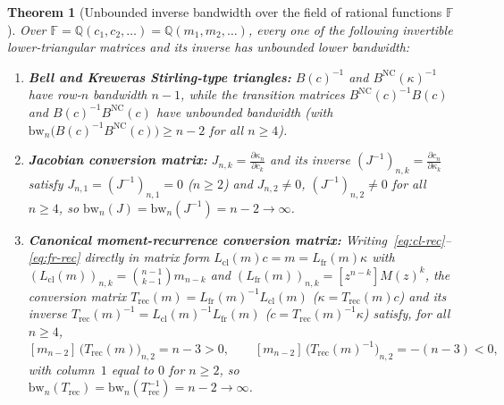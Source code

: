 \documentclass[11pt,a4paper]{article}
\newtheorem{theorem}{Theorem}[section]
\theoremstyle{definition}
\theoremstyle{remark}
\newcommand{\NC}{\mathrm{NC}}
\newcommand{\cl}{\mathrm{cl}}
\newcommand{\fr}{\mathrm{fr}}
\newcommand{\Q}{\mathbb{Q}}
\begin{document}
\begin{theorem}[Unbounded inverse bandwidth over the field of rational functions $\mathbb{F}$]\label{thm:rat-matrices-bw}
Over $\mathbb{F} = \Q(c_1,c_2,\dots) = \Q(m_1,m_2,\dots)$, every one of the following invertible lower-triangular matrices and its inverse has unbounded lower bandwidth:
\begin{enumerate}
  \item[(a)] \textbf{Bell and Kreweras Stirling-type triangles:} $B(c)^{-1}$ and $B^{\NC}(\kappa)^{-1}$ have row-$n$ bandwidth $n - 1$, while the transition matrices $B^{\NC}(c)^{-1}B(c)$ and $B(c)^{-1}B^{\NC}(c)$ have unbounded bandwidth (with $\mathrm{bw}_n\bigl(B(c)^{-1}B^{\NC}(c)\bigr) \ge n - 2$ for all $n \ge 4$).
  \item[(b)] \textbf{Jacobian conversion matrix:} $J_{n,k} = \frac{\partial \kappa_n}{\partial c_k}$ and its inverse $(J^{-1})_{n,k} = \frac{\partial c_n}{\partial \kappa_k}$ satisfy $J_{n,1} = (J^{-1})_{n,1} = 0$ ($n \ge 2$) and $J_{n,2} \ne 0$, $(J^{-1})_{n,2} \ne 0$ for all $n \ge 4$, so $\mathrm{bw}_n(J) = \mathrm{bw}_n(J^{-1}) = n - 2 \to \infty$.
  \item[(c)] \textbf{Canonical moment-recurrence conversion matrix:} Writing~\eqref{eq:cl-rec}--\eqref{eq:fr-rec} directly in matrix form $L_{\cl}(m) c = m = L_{\fr}(m)\kappa$ with $(L_{\cl}(m))_{n,k} = \binom{n-1}{k-1} m_{n-k}$ and $(L_{\fr}(m))_{n,k} = [z^{n-k}]M(z)^k$, the conversion matrix $T_{\mathrm{rec}}(m) = L_{\fr}(m)^{-1}L_{\cl}(m)$ ($\kappa = T_{\mathrm{rec}}(m) c$) and its inverse $T_{\mathrm{rec}}(m)^{-1} = L_{\cl}(m)^{-1}L_{\fr}(m)$ ($c = T_{\mathrm{rec}}(m)^{-1}\kappa$) satisfy, for all $n \ge 4$,
  \begin{equation}\label{eq:trec-col2}
    [m_{n-2}]\,\bigl(T_{\mathrm{rec}}(m)\bigr)_{n,2} = n - 3 > 0, \qquad
    [m_{n-2}]\,\bigl(T_{\mathrm{rec}}(m)^{-1}\bigr)_{n,2} = -(n - 3) < 0,
  \end{equation}
  with column~$1$ equal to $0$ for $n \ge 2$, so $\mathrm{bw}_n(T_{\mathrm{rec}}) = \mathrm{bw}_n(T_{\mathrm{rec}}^{-1}) = n - 2 \to \infty$.
\end{enumerate}
\end{theorem}
\end{document}
